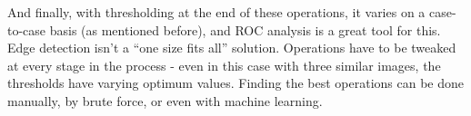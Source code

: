 \documentclass[10pt,a4paper]{article}
\begin{document}
And finally, with thresholding at the end of these operations, it varies on a case-to-case basis (as mentioned before), and ROC analysis is a great tool for this.
Edge detection isn’t a “one size fits all” solution. Operations have to be tweaked at every stage in the process - even in this case with three similar images, the thresholds have varying optimum values. Finding the best operations can be done manually, by brute force, or even with machine learning.


\end{document}
